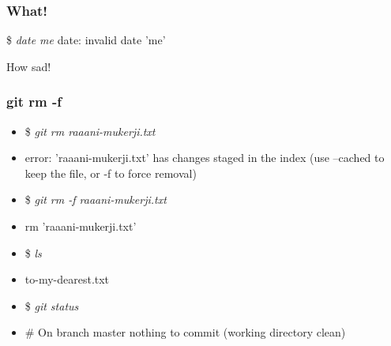 \documentclass[10pt]{beamer}
\newcommand{\medsize}[1]{\fontsize{30}{30}\selectfont #1}
\newcommand{\command}[1]{\textsl{\textit{#1}}}
\begin{document}
%
%

\begin{frame}[fragile]
\frametitle{What!}
\medsize{\$ \command{\alert{date me}}}
\newline \newline
\medsize{date: invalid date 'me'}
\newline 
\begin{center}
\medsize{\alert<1>{How sad!}}
\end{center}
\end{frame}


%
%

\begin{frame}[fragile]
\frametitle{git rm -f}
\begin{block}{}
\scriptsize
\begin{semiverbatim}
\begin{itemize}[<+-| alert@+>]
\item[]{\$ \command{git rm raaani-mukerji.txt}}
\item[]{error: 'raaani-mukerji.txt' has changes staged in the index
(use --cached to keep the file, or -f to force removal)}
\item[]{\$ \command{git rm -f raaani-mukerji.txt}}
\item[]{rm 'raaani-mukerji.txt'}

\item[]{\$ \command{ls}}
\item[]{to-my-dearest.txt}
\item[]{\$ \command{git status}}
\item[]{# On branch master
nothing to commit (working directory clean)}
\end{itemize}
\end{semiverbatim}
\end{block}


\end{frame}
\end{document}
